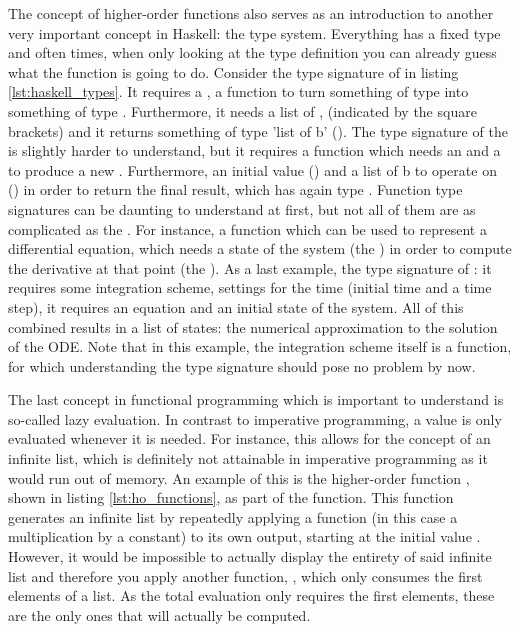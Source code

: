 The concept of higher-order functions also serves as an introduction to another very important concept in Haskell: the type system. Everything has a fixed type and often times, when only looking at the type definition you can already guess what the function is going to do. Consider the type signature of  in listing \ref{lst:haskell_types}. It requires a , a function to turn something of type  into something of type . Furthermore, it needs a list of , \code{[a]} (indicated by the square brackets) and it returns something of type 'list of b' (\code{[b]}). The type signature of the  is slightly harder to understand, but it requires a function which needs an  and a  to produce a new . Furthermore, an initial value () and a list of b to operate on (\code{[b]}) in order to return the final result, which has again type . Function type signatures can be daunting to understand at first, but not all of them are as complicated as the . For instance, a function which can be used to represent a differential equation, which needs a state of the system (the ) in order to compute the derivative at that point (the ). As a last example, the type signature of : it requires some integration scheme, settings for the time (initial time and a time step), it requires an equation and an initial state of the system. All of this combined results in a list of states: the numerical approximation to the solution of the ODE. Note that in this example, the integration scheme  itself is a function, for which understanding the type signature should pose no problem by now.

The last concept in functional programming which is important to understand is so-called lazy evaluation. In contrast to imperative programming, a value is only evaluated whenever it is needed. For instance, this allows for the concept of an infinite list, which is definitely not attainable in imperative programming as it would run out of memory. An example of this is the higher-order function , shown in listing \ref{lst:ho_functions}, as part of the  function. This function generates an infinite list by repeatedly applying a function (in this case a multiplication by a constant) to its own output, starting at the initial value . However, it would be impossible to actually display the entirety of said infinite list and therefore you apply another function, , which only consumes the first  elements of a list. As the total evaluation only requires the first  elements, these are the only ones that will actually be computed. \cite{FPintro}

